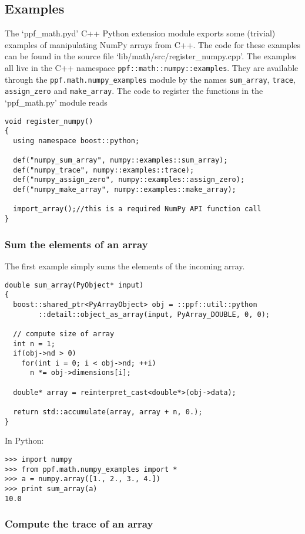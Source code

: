\subsection{Examples}

The `ppf\_math.pyd' C++ Python extension module exports some
(trivial) examples of manipulating NumPy arrays from C++. The code for
these examples can be found in the source file
`lib/math/src/register\_numpy.cpp'. The examples all live in the C++
namespace \verb|ppf::math::numpy::examples|. They are available
through the \verb|ppf.math.numpy_examples| module by the names
\verb|sum_array|, \verb|trace|, \verb|assign_zero| and
\verb|make_array|.  The code to register the functions in the
`ppf\_math.py' module reads
\begin{verbatim}
void register_numpy()
{
  using namespace boost::python;

  def("numpy_sum_array", numpy::examples::sum_array);
  def("numpy_trace", numpy::examples::trace);
  def("numpy_assign_zero", numpy::examples::assign_zero);
  def("numpy_make_array", numpy::examples::make_array);

  import_array();//this is a required NumPy API function call
}
\end{verbatim}

\subsubsection{Sum the elements of an array}

The first example simply sums the elements of the incoming array.
\begin{verbatim}
double sum_array(PyObject* input)
{
  boost::shared_ptr<PyArrayObject> obj = ::ppf::util::python
        ::detail::object_as_array(input, PyArray_DOUBLE, 0, 0);

  // compute size of array 
  int n = 1;
  if(obj->nd > 0)
    for(int i = 0; i < obj->nd; ++i) 
      n *= obj->dimensions[i];

  double* array = reinterpret_cast<double*>(obj->data);

  return std::accumulate(array, array + n, 0.);
}
\end{verbatim}
In Python:
\begin{verbatim}
>>> import numpy
>>> from ppf.math.numpy_examples import *
>>> a = numpy.array([1., 2., 3., 4.])
>>> print sum_array(a)
10.0
\end{verbatim}

\subsubsection{Compute the trace of an array}

